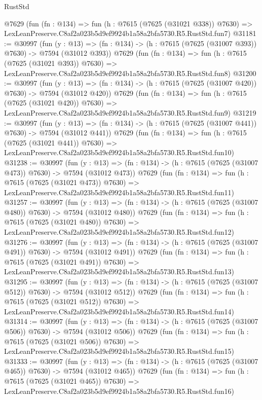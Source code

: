 \begin{lexlean}{RustStd}
\begin{coremodule}
    @7629
    (fun (fn : @134) =>
    fun (h : @7615 (@7625 (@31021 @338)) @7630) =>
    LexLeanPreserve.C8af2a023b5d9ef9924b1a58a2bfa5730.R5.RustStd.fun7)
@31181 := @30997
    (fun (y : @13) => (fn : @134) -> (h : @7615 (@7625 (@31007 @393)) @7630) -> @7594 (@31012 @393))
    @7629
    (fun (fn : @134) =>
    fun (h : @7615 (@7625 (@31021 @393)) @7630) =>
    LexLeanPreserve.C8af2a023b5d9ef9924b1a58a2bfa5730.R5.RustStd.fun8)
@31200 := @30997
    (fun (y : @13) => (fn : @134) -> (h : @7615 (@7625 (@31007 @420)) @7630) -> @7594 (@31012 @420))
    @7629
    (fun (fn : @134) =>
    fun (h : @7615 (@7625 (@31021 @420)) @7630) =>
    LexLeanPreserve.C8af2a023b5d9ef9924b1a58a2bfa5730.R5.RustStd.fun9)
@31219 := @30997
    (fun (y : @13) => (fn : @134) -> (h : @7615 (@7625 (@31007 @441)) @7630) -> @7594 (@31012 @441))
    @7629
    (fun (fn : @134) =>
    fun (h : @7615 (@7625 (@31021 @441)) @7630) =>
    LexLeanPreserve.C8af2a023b5d9ef9924b1a58a2bfa5730.R5.RustStd.fun10)
@31238 := @30997
    (fun (y : @13) => (fn : @134) -> (h : @7615 (@7625 (@31007 @473)) @7630) -> @7594 (@31012 @473))
    @7629
    (fun (fn : @134) =>
    fun (h : @7615 (@7625 (@31021 @473)) @7630) =>
    LexLeanPreserve.C8af2a023b5d9ef9924b1a58a2bfa5730.R5.RustStd.fun11)
@31257 := @30997
    (fun (y : @13) => (fn : @134) -> (h : @7615 (@7625 (@31007 @480)) @7630) -> @7594 (@31012 @480))
    @7629
    (fun (fn : @134) =>
    fun (h : @7615 (@7625 (@31021 @480)) @7630) =>
    LexLeanPreserve.C8af2a023b5d9ef9924b1a58a2bfa5730.R5.RustStd.fun12)
@31276 := @30997
    (fun (y : @13) => (fn : @134) -> (h : @7615 (@7625 (@31007 @491)) @7630) -> @7594 (@31012 @491))
    @7629
    (fun (fn : @134) =>
    fun (h : @7615 (@7625 (@31021 @491)) @7630) =>
    LexLeanPreserve.C8af2a023b5d9ef9924b1a58a2bfa5730.R5.RustStd.fun13)
@31295 := @30997
    (fun (y : @13) => (fn : @134) -> (h : @7615 (@7625 (@31007 @512)) @7630) -> @7594 (@31012 @512))
    @7629
    (fun (fn : @134) =>
    fun (h : @7615 (@7625 (@31021 @512)) @7630) =>
    LexLeanPreserve.C8af2a023b5d9ef9924b1a58a2bfa5730.R5.RustStd.fun14)
@31314 := @30997
    (fun (y : @13) => (fn : @134) -> (h : @7615 (@7625 (@31007 @506)) @7630) -> @7594 (@31012 @506))
    @7629
    (fun (fn : @134) =>
    fun (h : @7615 (@7625 (@31021 @506)) @7630) =>
    LexLeanPreserve.C8af2a023b5d9ef9924b1a58a2bfa5730.R5.RustStd.fun15)
@31333 := @30997
    (fun (y : @13) => (fn : @134) -> (h : @7615 (@7625 (@31007 @465)) @7630) -> @7594 (@31012 @465))
    @7629
    (fun (fn : @134) =>
    fun (h : @7615 (@7625 (@31021 @465)) @7630) =>
    LexLeanPreserve.C8af2a023b5d9ef9924b1a58a2bfa5730.R5.RustStd.fun16)

\end{coremodule}
\end{lexlean}
